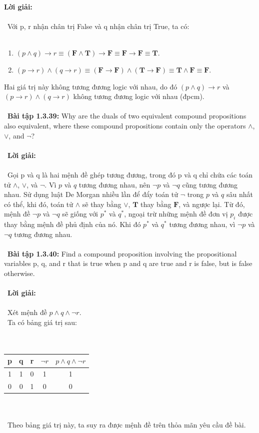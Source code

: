 \documentclass[a4paper]{article}
\begin{document}
\textbf{Lời giải: } \\\ \\\ 
Với p, r nhận chân trị False và q nhận chân trị True, ta có: \\\ 
\begin{enumerate}
	\item $(p \land q) \rightarrow r \equiv (\textbf{F} \land \textbf{T}) \rightarrow \textbf{F} \equiv \textbf{F} \rightarrow \textbf{F} \equiv \textbf{T}.$ 
	\item $(p \rightarrow r) \land (q \rightarrow r) \equiv (\textbf{F} \rightarrow \textbf{F}) \land (\textbf{T} \rightarrow \textbf{F}) \equiv \textbf{T} \land \textbf{F} \equiv \textbf{F}.$
\end{enumerate}
Hai giá trị này không tương đương logic với nhau, do đó $(p \land q) \rightarrow r$ và $(p \rightarrow r) \land (q \rightarrow r)$ không tương đương logic với nhau (đpcm). \\\ \\\
\textbf{Bài tập 1.3.39: }Why are the duals of two equivalent compound propositions also equivalent, where these compound propositions contain only the operators $\land$, $\lor$, and $\lnot$? \\\ \\\
\textbf{Lời giải: } \\\ \\\
Gọi p và q là hai mệnh đề ghép tương đương, trong đó p và q chỉ chứa các toán tử $\land$, $\lor$, và $\lnot$. Vì $p$ và $q$ tương đương nhau, nên $\lnot p$ và $\lnot q$ cũng tương đương nhau. Sử dụng luật De Morgan nhiều lần để đẩy toán tử $\lnot$ trong $p$ và $q$ sâu nhất có thể, khi đó, toán tử $\land$ sẽ thay bằng $\lor$, $\textbf{T}$ thay bằng $\textbf{F}$, và ngược lại. Từ đó, mệnh đề $\lnot p$ và $\lnot q$ sẽ giống với $p^*$ và $q^*$, ngoại trừ những mệnh đề đơn vị $p_i$ được thay bằng mệnh đề phủ định của nó. Khi đó $p^*$ và $q^*$ tương đương nhau, vì $\lnot p$ và $\lnot q$ tương đương nhau. \\\ \\\
\textbf{Bài tập 1.3.40: }Find a compound proposition involving the propositional variables p, q, and r that is true when p and q are true and r is false, but is false otherwise. \\\ \\\
\textbf{Lời giải: } \\\ \\\
Xét mệnh đề $p \land q \land \lnot r.$ \\\
Ta có bảng giá trị sau: \\\  \\\
\begin{tabular}{|c|c|c|c|c|}
\hline 
p & q & r & $\lnot r$ & $p \land q \land \lnot r$\\ 
\hline 
1 & 1 & 0 & 1 & 1\\ 
\hline 
0 & 0 & 1 & 0 & 0\\ 
\hline 
\end{tabular} \\\ \\\
Theo bảng giá trị này, ta suy ra được mệnh đề trên thỏa mãn yêu cầu đề bài. \\\ \\\
\clearpage
\end{document}
